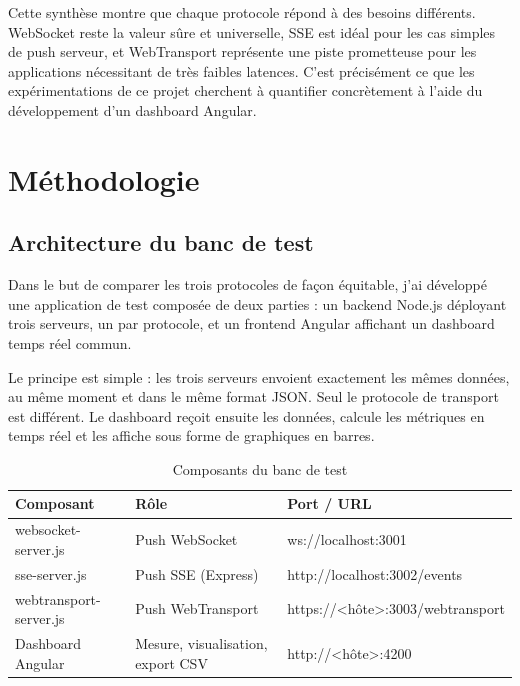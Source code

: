 Cette synthèse montre que chaque protocole répond à des besoins différents. WebSocket reste la valeur sûre et universelle, SSE est idéal pour les cas simples de push serveur, et WebTransport représente une piste prometteuse pour les applications nécessitant de très faibles latences. C'est précisément ce que les expérimentations de ce projet cherchent à quantifier concrètement à l'aide du développement d'un dashboard Angular.

\section{Méthodologie}

\subsection{Architecture du banc de test}

Dans le but de comparer les trois protocoles de façon équitable, j'ai développé une application de test composée de deux parties : un backend Node.js déployant trois serveurs, un par protocole, et un frontend Angular affichant un dashboard temps réel commun.

Le principe est simple : les trois serveurs envoient exactement les mêmes données, au même moment et dans le même format JSON. Seul le protocole de transport est différent. Le dashboard reçoit ensuite les données, calcule les métriques en temps réel et les affiche sous forme de graphiques en barres.

\begin{table}[H]
\centering
\small
\begin{tabular}{|l|l|l|}
\hline
\textbf{Composant} & \textbf{Rôle} & \textbf{Port / URL} \\
\hline
websocket-server.js & Push WebSocket & ws://localhost:3001 \\
sse-server.js & Push SSE (Express) & http://localhost:3002/events \\
webtransport-server.js & Push WebTransport & https://\textless{}hôte\textgreater{}:3003/webtransport \\
Dashboard Angular & Mesure, visualisation, export CSV & http://\textless{}hôte\textgreater{}:4200 \\
\hline
\end{tabular}
\caption{Composants du banc de test}
\end{table}

